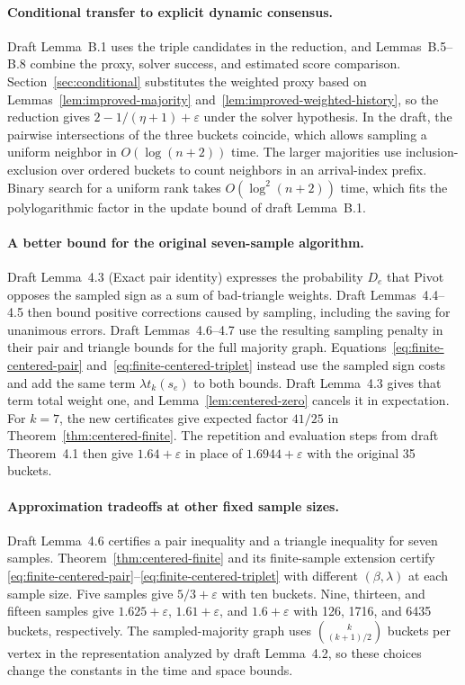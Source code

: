 \documentclass[11pt]{article}
\begin{document}
\paragraph{Conditional transfer to explicit dynamic consensus.}
Draft Lemma~B.1 uses the triple candidates in the reduction, and
Lemmas~B.5--B.8 combine the proxy, solver success, and estimated score
comparison. Section~\ref{sec:conditional} substitutes the weighted
proxy based on Lemmas~\ref{lem:improved-majority}
and~\ref{lem:improved-weighted-history}, so the reduction gives
$2-1/(\eta+1)+\varepsilon$ under the solver hypothesis. In the draft,
the pairwise intersections of the three buckets coincide, which allows
sampling a uniform neighbor in $O(\log(n+2))$ time. The larger majorities
use inclusion-exclusion over ordered buckets to count neighbors in an
arrival-index prefix. Binary search for a uniform rank takes
$O(\log^2(n+2))$ time, which fits the polylogarithmic factor in the
update bound of draft Lemma~B.1.

\paragraph{A better bound for the original seven-sample algorithm.}
Draft Lemma~4.3 (Exact pair identity) expresses the probability $D_e$
that Pivot opposes the sampled sign as a sum of bad-triangle weights.
Draft Lemmas~4.4--4.5 then bound positive corrections caused by sampling,
including the saving for unanimous errors. Draft Lemmas~4.6--4.7 use
the resulting sampling penalty in their pair and triangle bounds for
the full majority graph. Equations~\eqref{eq:finite-centered-pair}
and~\eqref{eq:finite-centered-triplet} instead use the sampled sign costs
and add the same term $\lambda t_k(s_e)$ to both bounds. Draft
Lemma~4.3 gives that term total weight one, and
Lemma~\ref{lem:centered-zero} cancels it in expectation. For $k=7$,
the new certificates give expected factor $41/25$ in
Theorem~\ref{thm:centered-finite}. The repetition and evaluation steps
from draft Theorem~4.1 then give $1.64+\varepsilon$ in place of
$1.6944+\varepsilon$ with the original 35 buckets.

\paragraph{Approximation tradeoffs at other fixed sample sizes.}
Draft Lemma~4.6 certifies a pair inequality and a triangle inequality
for seven samples. Theorem~\ref{thm:centered-finite} and its finite-sample
extension certify \eqref{eq:finite-centered-pair}--\eqref{eq:finite-centered-triplet}
with different $(\beta,\lambda)$ at each sample size. Five samples
give $5/3+\varepsilon$ with ten buckets. Nine, thirteen, and fifteen
samples give $1.625+\varepsilon$, $1.61+\varepsilon$, and
$1.6+\varepsilon$ with 126, 1716, and 6435 buckets, respectively.
The sampled-majority graph uses $\binom{k}{(k+1)/2}$ buckets per vertex
in the representation analyzed by draft Lemma~4.2, so these choices
change the constants in the time and space bounds.
\end{document}

